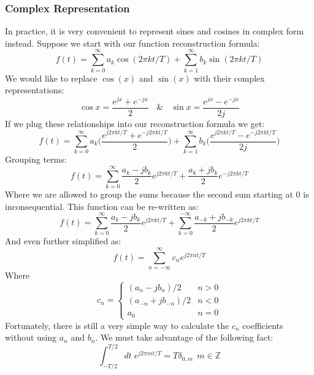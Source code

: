 \documentclass[a4paper]{article}
\numberwithin{equation}{section}
\begin{document}
\subsubsection{Complex Representation}
In practice, it is very convenient to represent sines and cosines in complex form instead. Suppose we start with our function reconstruction formula:
\begin{equation}
f(t)=\sum_{k=0}^{\infty}a_k\cos{(2\pi kt/T)}+\sum_{k=1}^{\infty}b_k\sin{(2\pi kt/T)}
\end{equation}
We would like to replace $\cos(x)$ and $\sin(x)$ with their complex representations:
\begin{equation}
\cos{x}=\frac{e^{jx}+e^{-jx}}{2} \: \: \: \: \& \: \: \: \: \sin{x}=\frac{e^{jx}-e^{-jx}}{2j} 
\end{equation}
If we plug these relationships into our reconstruction formula we get: 
\begin{equation}
f(t)=\sum_{k=0}^{\infty}a_k\big(\frac{e^{j2\pi kt/T}+e^{-j2\pi kt/T}}{2} \big)+\sum_{k=1}^{\infty}b_k\big(\frac{e^{j2\pi kt/T}-e^{-j2\pi kt/T}}{2j} \big)
\end{equation}
Grouping terms:
\begin{equation}
f(t)=\sum_{k=0}^{\infty}\frac{a_k-jb_k}{2}e^{j2\pi kt/T}+\frac{a_k+jb_k}{2}e^{-j2\pi kt/T}
\end{equation}
Where we are allowed to group the sums because the second sum starting at 0 is inconsequential. This function can be re-written as:
\begin{equation}
f(t)=\sum_{k=0}^{\infty}\frac{a_k-jb_k}{2}e^{j2\pi kt/T}+\sum_{k=0}^{-\infty}\frac{a_{-k}+jb_{-k}}{2}e^{j2\pi kt/T}
\end{equation}
And even further simplified as:
\begin{equation}
\boxed{
f(t)=\sum_{n=-\infty}^{\infty}c_n e^{j2\pi nt/T}
}
\end{equation}
Where
\begin{equation}
c_n =
\begin{cases} 
      (a_n-jb_n)/2 & n>0 \\
      (a_{-n}+jb_{-n})/2 & n<0\\
      a_0 & n=0
   \end{cases}
\end{equation}
Fortunately, there is still a very simple way to calculate the $c_n$ coefficients without using $a_n$ and $b_n$. We must take advantage of the following fact:
\begin{equation}
\int_{-T/2}^{T/2}dt \; e^{j2\pi mt/T} = T\delta_{0,m} \: \: m \in \mathbb{Z}
\end{equation}
\end{document}
